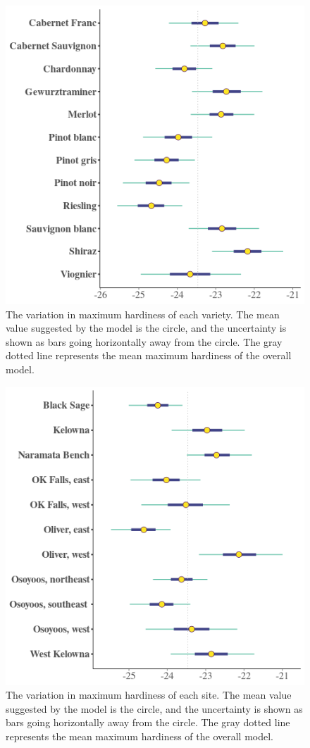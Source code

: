\documentclass[11pt,letter]{article}
\begin{document}
\begin{figure}[h]
  \includegraphics[scale = 0.75]{varDs.png}
  \caption{The variation in maximum hardiness of each variety. The mean value suggested by the model is the circle, and the uncertainty is shown as bars going horizontally away from the circle. The gray dotted line represents the mean maximum hardiness of the overall model.}
  \label{fig:varDs}
\end{figure}

\begin{figure}[h]
  \includegraphics[scale = 0.75]{siteDs.png}
  \caption{The variation in maximum hardiness of each site. The mean value suggested by the model is the circle, and the uncertainty is shown as bars going horizontally away from the circle. The gray dotted line represents the mean maximum hardiness of the overall model.}
  \label{fig:siteDs}
\end{figure}
\end{document}
